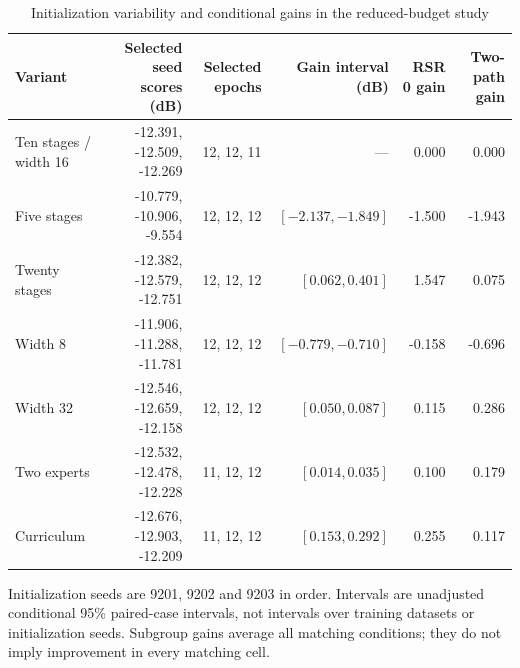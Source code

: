 \begin{table}[!t]
\caption{Initialization variability and conditional gains in the reduced-budget study}
\centering\small\setlength{\tabcolsep}{5pt}
\begin{tabular}{@{}lrrrrr@{}}\toprule
Variant & Selected seed scores (dB) & Selected epochs & Gain interval (dB) & RSR 0 gain & Two-path gain\\\midrule
Ten stages / width 16 & -12.391, -12.509, -12.269 & 12, 12, 11 & --- & 0.000 & 0.000\\
Five stages & -10.779, -10.906, -9.554 & 12, 12, 12 & $[-2.137,-1.849]$ & -1.500 & -1.943\\
Twenty stages & -12.382, -12.579, -12.751 & 12, 12, 12 & $[0.062,0.401]$ & 1.547 & 0.075\\
Width 8 & -11.906, -11.288, -11.781 & 12, 12, 12 & $[-0.779,-0.710]$ & -0.158 & -0.696\\
Width 32 & -12.546, -12.659, -12.158 & 12, 12, 12 & $[0.050,0.087]$ & 0.115 & 0.286\\
Two experts & -12.532, -12.478, -12.228 & 11, 12, 12 & $[0.014,0.035]$ & 0.100 & 0.179\\
Curriculum & -12.676, -12.903, -12.209 & 11, 12, 12 & $[0.153,0.292]$ & 0.255 & 0.117\\
\bottomrule\end{tabular}
\parbox{\textwidth}{\footnotesize Initialization seeds are 9201, 9202 and 9203 in order.
Intervals are unadjusted conditional 95\% paired-case intervals, not intervals over training datasets or initialization seeds.
Subgroup gains average all matching conditions; they do not imply improvement in every matching cell.}
\end{table}
